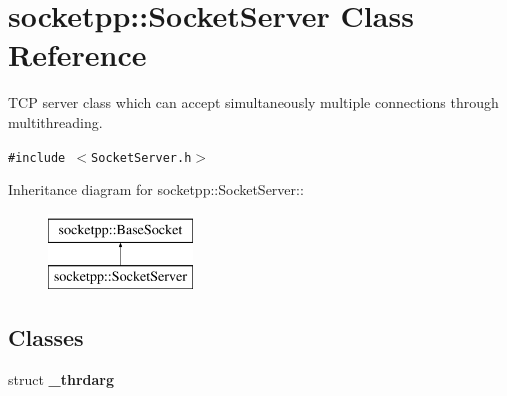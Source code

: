 \hypertarget{classsocketpp_1_1SocketServer}{
\section{socketpp::SocketServer Class Reference}
\label{classsocketpp_1_1SocketServer}
}
TCP server class which can accept simultaneously multiple connections through multithreading.  


{\tt \#include $<$SocketServer.h$>$}

Inheritance diagram for socketpp::SocketServer::\begin{figure}[H]
\begin{center}
\leavevmode
\includegraphics[height=2cm]{classsocketpp_1_1SocketServer}
\end{center}
\end{figure}
\subsection*{Classes}
\begin{CompactItemize}
\item 
struct \textbf{\_\-thrdarg}
\end{CompactItemize}
